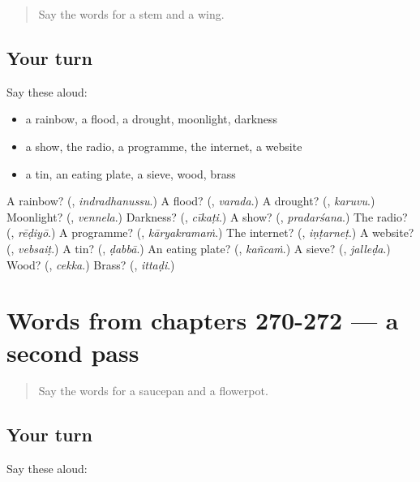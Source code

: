 \label{lesson:TE-R272-first-pass-words-from-chapters-267-269}



\begin{quote}
Say the words for a stem and a wing.
\end{quote}

\subsection*{Your turn}
Say these aloud:

\begin{itemize}
\raggedright
  \item a rainbow, a flood, a drought, moonlight, darkness
  \item a show, the radio, a programme, the internet, a website
  \item a tin, an eating plate, a sieve, wood, brass
\end{itemize}

\begin{tcolorbox}[breakable,colback=teal!4,colframe=teal!35!black,title={Before you move on}]
A rainbow? (\textbf{}, \emph{indradhanussu}.) A flood? (\textbf{}, \emph{varada}.) A drought? (\textbf{}, \emph{karuvu}.) Moonlight? (\textbf{}, \emph{vennela}.) Darkness? (\textbf{}, \emph{cīkaṭi}.) A show? (\textbf{}, \emph{pradarśana}.) The radio? (\textbf{}, \emph{rēḍiyō}.) A programme? (\textbf{}, \emph{kāryakramaṁ}.) The internet? (\textbf{}, \emph{iṇṭarneṭ}.) A website? (\textbf{}, \emph{vebsaiṭ}.) A tin? (\textbf{}, \emph{ḍabbā}.) An eating plate? (\textbf{}, \emph{kañcaṁ}.) A sieve? (\textbf{}, \emph{jalleḍa}.) Wood? (\textbf{}, \emph{cekka}.) Brass? (\textbf{}, \emph{ittaḍi}.)
\end{tcolorbox}
\section[(dialogue)]{Words from chapters 270-272 — a second pass}

\label{lesson:TE-R272-second-pass-words-from-chapters-270-272}



\begin{quote}
Say the words for a saucepan and a flowerpot.
\end{quote}

\subsection*{Your turn}
Say these aloud:

